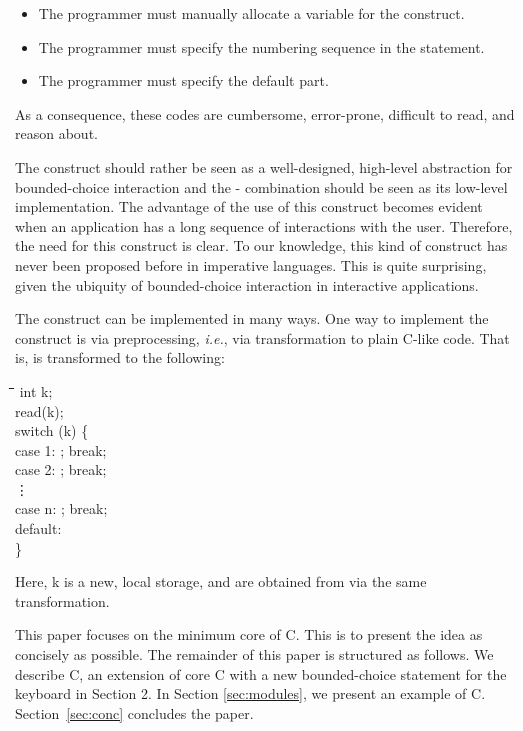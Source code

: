 \documentclass[letter]{ieice}
\newcommand{\ie}{{\em i.e.}}
\newenvironment{exmple}{
 \begingroup \begin{tabbing} \hspace{2em}\= \hspace{3em}\= \hspace{3em}\=
\hspace{3em}\= \hspace{3em}\= \hspace{3em}\= \kill}{
 \end{tabbing}\endgroup}
\newcommand{\muprolog}{{C}}
\begin{document}
\begin{itemize}

\item The programmer must manually allocate a variable for the
 construct.

\item The programmer must specify the numbering sequence in the  statement.

\item The programmer must specify the default part.

\end{itemize}
\noindent
As a consequence, these codes are cumbersome, error-prone, difficult to read,  and reason about.


 The   construct should rather be seen as a well-designed, 
high-level abstraction for bounded-choice interaction and the  
- combination should  be seen as  its low-level implementation. 
 The advantage of the use of this construct becomes evident when an application has a long
sequence of  interactions with the user. Therefore, the need for this construct is clear.
 To our knowledge, this kind of construct  has never been proposed before in imperative languages.
This is quite surprising, given the ubiquity of
  bounded-choice interaction in interactive applications.

The   construct can be implemented in many ways. One way to implement the   construct is via preprocessing, \ie, via transformation to plain C-like code.
That is,   is transformed to the following: 

\begin{exmple}
         int k; \\
        read(k); \\
        switch (k) \{ \\
 \>           case 1:  ;   break; \\
  \>          case 2:  ;   break;\\
\> \vdots \\
 \>           case n:  ;    break;\\
 \>           default:           \\
        \}\\
\end{exmple}
\noindent Here, k is a new, local storage, and  are obtained from
  via the same transformation.

This paper focuses on the minimum 
core of C. This is to present the idea as concisely as possible.
The remainder of this paper is structured as follows. We describe 
 \muprolog, an extension of  core C  with a new 
bounded-choice statement for the keyboard
 in Section 2. In Section \ref{sec:modules}, we
present an example of  \muprolog.
Section~\ref{sec:conc} concludes the paper.
\end{document}
